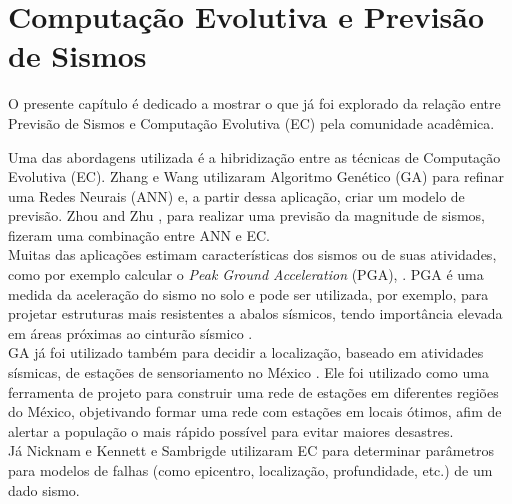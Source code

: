 \chapter{Computação Evolutiva e Previsão de Sismos}


O presente capítulo é dedicado a mostrar o que já foi explorado da relação entre Previsão de Sismos e Computação Evolutiva (EC) pela comunidade acadêmica.%

Uma das abordagens utilizada é a hibridização entre as técnicas de Computação Evolutiva (EC). Zhang e Wang \cite{Zhang2012} utilizaram Algoritmo Genético (GA) para refinar uma Redes Neurais (ANN) e, a partir dessa aplicação, criar um modelo de previsão. Zhou and Zhu \cite{zhou2014earthquake}, para realizar uma previsão da magnitude de sismos, fizeram uma combinação entre ANN e EC.\\

Muitas das aplicações estimam características dos sismos ou de suas atividades, como por exemplo calcular o {\it Peak Ground Acceleration} (PGA), \cite{pga_Kerh, Kermani2009, Cabalar2009}. PGA é uma medida da aceleração do sismo no solo e pode ser utilizada, por exemplo, para projetar estruturas mais resistentes a abalos sísmicos, tendo importância elevada em áreas próximas ao cinturão sísmico \cite{Cabalar2009}.\\

GA já foi utilizado também para decidir a localização, baseado em atividades sísmicas, de estações de sensoriamento no México \cite{Ramos2011}. Ele foi utilizado como uma ferramenta de projeto para construir uma rede de estações em diferentes regiões do México, objetivando formar uma rede com estações em locais ótimos, afim de alertar a população o mais rápido possível para evitar maiores desastres.\\

Já Nicknam \cite{Nicknam2010} e Kennett e Sambrigde \cite{Kennett1992} utilizaram EC para determinar parâmetros para modelos de falhas (como epicentro, localização, profundidade, etc.) de um dado sismo.\\%

